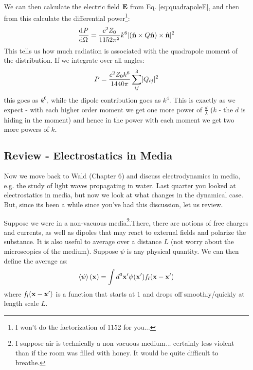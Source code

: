 \begin{itemize}
    We can then calculate the electric field $\mathbf{E}$ from Eq. \eqref{eq:quadrapoleE}, and then from this calculate the differential power\footnote{I won't do the factorization of 1152 for you...}:
    \begin{equation}
        \dod{P}{\Omega} = \frac{c^2Z_0}{1152\pi^2}k^6\abs{(\hat{\v{n}} \times Q\hat{\v{n}}) \times \hat{\v{n}}}^2
    \end{equation}
    This tells us how much radiation is associated with the quadrapole moment of the distribution. If we integrate over all angles:
    \begin{equation}
        P = \frac{c^2Z_0k^6}{1440\pi}\sum_{ij}^3\lvert Q_{ij} \rvert^2
    \end{equation}
    this goes as $k^6$, while the dipole contribution goes as $k^4$. This is exactly as we expect - with each higher order moment we get one more power of $\frac{d}{\lambda}$ ($k$ - the $d$ is hiding in the moment) and hence in the power with each moment we get two more powers of $k$.
\end{itemize}

\subsection{Review - Electrostatics in Media}
Now we move back to Wald (Chapter 6) and discuss electrodynamics in media, e.g. the study of light waves propagating in water.
Last quarter you looked at electrostatics in media, but now we look at what changes in the dynamical case. But, since its been a while since you've had this discussion, let us review. 

Suppose we were in a non-vacuous media\footnote{I suppose air is technically a non-vacuous medium... certainly less violent than if the room was filled with honey. It would be quite difficult to breathe.}.There, there are notions of free charges and currents, as well as dipoles that may react to external fields and polarize the substance. It is also useful to average over a distance $L$ (not worry about the microscopics of the medium). Suppose $\psi$ is any physical quantity. We can then define the average as:
\begin{equation}
    \left< \psi \right>(\mathbf{x}) = \int d^3\mathbf{x}' \psi(\mathbf{x}')f_l(\mathbf{x} - \mathbf{x}')
\end{equation}
where $f_l(\mathbf{x} - \mathbf{x}')$ is a function that starts at 1 and drops off smoothly/quickly at length scale $L$.

